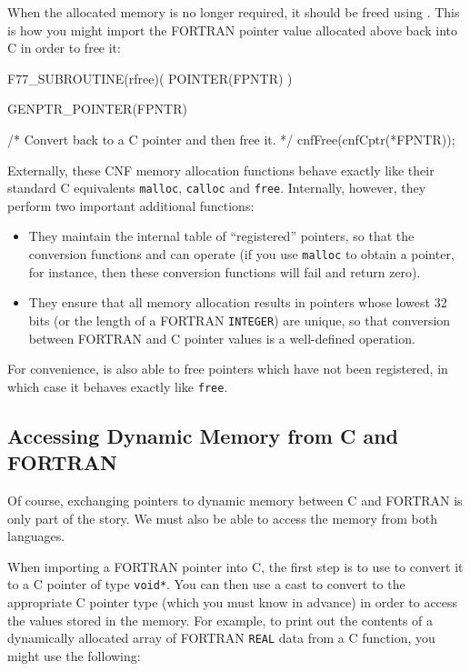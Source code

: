 \documentclass[twoside,11pt,nolof]{starlink}
\begin{document}
When the allocated memory is no longer required, it should be freed
using
.
This is how you might import the FORTRAN
pointer value allocated above back into C in order to free it:

\begin{small}
\begin{terminalv}
F77_SUBROUTINE(rfree)( POINTER(FPNTR) )
{
   GENPTR_POINTER(FPNTR)

/* Convert back to a C pointer and then free it. */
   cnfFree(cnfCptr(*FPNTR));
}
\end{terminalv}
\end{small}

Externally, these CNF memory allocation functions behave exactly like
their standard C equivalents \texttt{malloc}, \texttt{calloc} and
\texttt{free}. Internally, however, they perform two important
additional functions:
\begin{itemize}

\item They maintain the internal table of ``registered'' pointers, so
that the conversion functions
and
can operate (if you use \texttt{malloc} to obtain a
pointer, for instance, then these conversion functions will fail and
return zero).

\item They ensure that all memory allocation results in pointers whose
lowest 32 bits (or the length of a FORTRAN \texttt{INTEGER}) are
unique, so that conversion between FORTRAN and C pointer values is a
well-defined operation.
\end{itemize}

For convenience,
is also able to free pointers
which have not been registered, in which case it behaves exactly like
\texttt{free}.

\subsection{\label{percentval}Accessing
Dynamic Memory from C and FORTRAN}

Of course, exchanging pointers to dynamic memory between C and FORTRAN
is only part of the story. We must also be able to access the memory
from both languages.

When importing a FORTRAN pointer into C, the first step is to use
to convert it to a C pointer of type
\texttt{void*}. You can then use a cast to convert to the appropriate
C pointer type (which you must know in advance) in order to access the
values stored in the memory. For example, to print out the contents of
a dynamically allocated array of FORTRAN \texttt{REAL} data from a C
function, you might use the following:
\end{document}
